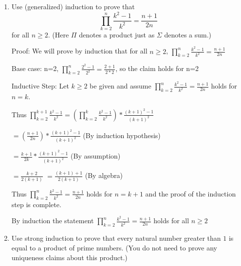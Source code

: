 \documentclass{article}
\newcommand{\bN}{\mathbb{N}}
\begin{document}
{\begin{enumerate}[labelindent=0pt,leftmargin=0pt]
\begin{enumerate}
    Let $A = \bN$ and $B = {1}$. Both $A$ and $B$ are inductive subsets of $\mathbb{N}$. 
    
    Therefore, $A - B = \bN - \{1\} = \{2,3,4,\ldots\}$:

    In this case, $A - B$ does not contain $1$. Therefore, $A - B$ is not inductive.


    \item $A-B$ is not inductive.
   
    Let $A={1,3,5,\ldots}$ and $B={2,4,6,\ldots}$. Both $A$ and $B$ are inductive subsets of $\mathbb{N}$. 
    
    Then $A-B={1,3,5,\ldots}$, which is inductive. 


    \end{enumerate}


    \item Use (generalized) induction to prove that $$\prod_{k=2}^n\frac{k^2-1}{k^2}=\frac{n+1}{2n}$$ for all $n\geq 2$. (Here $\Pi$ denotes a product just as $\Sigma$ denotes a sum.)


    Proof: We will prove by induction that for all $n\geq 2$, $\prod_{k=2}^n\frac{k^2-1}{k^2}=\frac{n+1}{2n}$
    
    Base case: n=2, $\prod_{k=2}^n\frac{2^2-1}{2^2}=\frac{2+1}{2*2}$, so the claim holds for n=2
    
    Inductive Step: Let $k \geq 2$ be given and assume $\prod_{k=2}^n\frac{k^2-1}{k^2}=\frac{n+1}{2n}$ holds for $n=k$.
    

    Thus $\prod_{k=2}^{k+1}\frac{k^2-1}{k^2}=(\prod_{k=2}^k\frac{k^2-1}{k^2}) * \frac{(k+1)^2-1}{(k+1)^2}$ 
   
    $=(\frac{n+1}{2n}) * \frac{(k+1)^2-1}{(k+1)^2}$ (By induction hypothesis)

    $=\frac{k+1}{2k} * \frac{(k+1)^2-1}{(k+1)^2}$ (By assumption) 

    $=\frac{k+2}{2(k+1)}$ $=\frac{(k+1)+1}{2(k+1)}$ (By algebra)

    Thus $\prod_{k=2}^n\frac{k^2-1}{k^2}=\frac{n+1}{2n}$ holds for $n=k+1$ and the proof of the induction step is complete. 

    By induction the statement $\prod_{k=2}^n\frac{k^2-1}{k^2}=\frac{n+1}{2n}$ holds for all $n\geq 2$
    
  


    \item Use strong induction to prove that every natural number greater than $1$ is equal to a product of prime numbers. (You do not need to prove any uniqueness claims about this product.)


\end{enumerate}}
\end{document}
